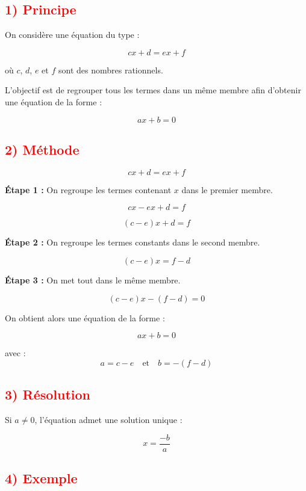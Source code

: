 \documentclass[12pt,a4paper]{article}
\begin{document}
\subsection*{\textcolor{red}{1) Principe}}

On considère une équation du type :

\[
cx + d = ex + f
\]

où $c$, $d$, $e$ et $f$ sont des nombres rationnels.

L’objectif est de regrouper tous les termes dans un même membre afin d’obtenir une équation de la forme :

\[
ax + b = 0
\]

\vspace{0.5cm}

\subsection*{\textcolor{red}{2) Méthode}}

\[
cx + d = ex + f
\]

\textbf{Étape 1 :} On regroupe les termes contenant $x$ dans le premier membre.

\[
cx - ex + d = f
\]

\[
(c - e)x + d = f
\]

\textbf{Étape 2 :} On regroupe les termes constants dans le second membre.

\[
(c - e)x = f - d
\]

\textbf{Étape 3 :} On met tout dans le même membre.

\[
(c - e)x - (f - d) = 0
\]

On obtient alors une équation de la forme :

\[
ax + b = 0
\]

avec :
\[
a = c - e \quad \text{et} \quad b = -(f - d)
\]

\vspace{0.5cm}

\subsection*{\textcolor{red}{3) Résolution}}

Si $a \neq 0$, l’équation admet une solution unique :

\[
x = \frac{-b}{a}
\]

\vspace{0.5cm}

\subsection*{\textcolor{red}{4) Exemple}}
\end{document}
